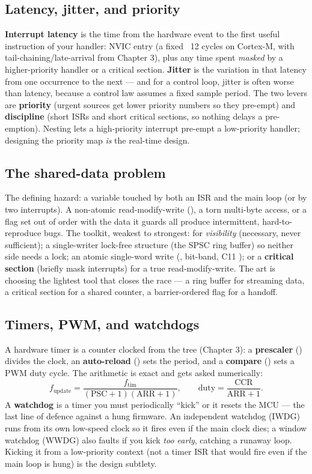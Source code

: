 \subsection{Latency, jitter, and priority}

\textbf{Interrupt latency} is the time from the hardware event to the first
useful instruction of your handler: NVIC entry (a fixed ~12 cycles on
Cortex-M, with tail-chaining/late-arrival from Chapter 3), plus any time spent
\emph{masked} by a higher-priority handler or a critical section.
\textbf{Jitter} is the variation in that latency from one occurrence to the
next --- and for a control loop, jitter is often worse than latency, because a
control law assumes a fixed sample period. The two levers are
\textbf{priority} (urgent sources get lower priority numbers so they pre-empt)
and \textbf{discipline} (short ISRs and short critical sections, so nothing
delays a pre-emption). Nesting lets a high-priority interrupt pre-empt a
low-priority handler; designing the priority map \emph{is} the real-time design.

\subsection{The shared-data problem}

The defining hazard: a variable touched by both an ISR and the main loop (or by
two interrupts). A non-atomic read-modify-write (), a torn
multi-byte access, or a flag set out of order with the data it guards all
produce intermittent, hard-to-reproduce bugs. The toolkit, weakest to
strongest:  for \emph{visibility} (necessary, never sufficient);
a single-writer lock-free structure (the SPSC ring buffer) so neither side
needs a lock; an atomic single-word write (, bit-band, C11
); or a \textbf{critical section} (briefly mask interrupts) for a
true read-modify-write. The art is choosing the lightest tool that closes the
race --- a ring buffer for streaming data, a critical section for a shared
counter, a barrier-ordered flag for a handoff.

\subsection{Timers, PWM, and watchdogs}

A hardware timer is a counter clocked from the tree (Chapter 3): a
\textbf{prescaler} () divides the clock, an \textbf{auto-reload}
() sets the period, and a \textbf{compare} () sets a PWM
duty cycle. The arithmetic is exact and gets asked numerically:
\[
f_{\text{update}}=\frac{f_{\text{tim}}}{(\text{PSC}+1)(\text{ARR}+1)},\qquad
\text{duty}=\frac{\text{CCR}}{\text{ARR}+1}.
\]
A \textbf{watchdog} is a timer you must periodically ``kick'' or it resets the
MCU --- the last line of defence against a hung firmware. An independent
watchdog (IWDG) runs from its own low-speed clock so it fires even if the main
clock dies; a window watchdog (WWDG) also faults if you kick \emph{too early},
catching a runaway loop. Kicking it from a low-priority context (not a timer
ISR that would fire even if the main loop is hung) is the design subtlety.

